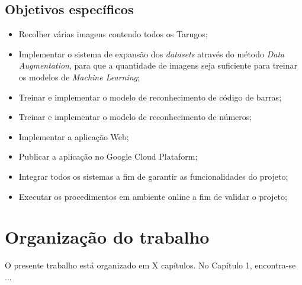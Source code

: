 \subsection{Objetivos específicos}

\begin{itemize}
	\item Recolher várias imagens contendo todos os Tarugos;
	\item Implementar o sistema de expansão dos \textit{datasets} através do método \textit{Data Augmentation}, para que a quantidade de imagens seja suficiente para treinar os modelos de \textit{Machine Learning};
	\item Treinar e implementar o modelo de reconhecimento de código de barras;
	\item Treinar e implementar o modelo de reconhecimento de números;
	\item Implementar a aplicação Web;
	\item Publicar a aplicação no Google Cloud Plataform;
	\item Integrar todos os sistemas a fim de garantir as funcionalidades do projeto;
	\item Executar os procedimentos em ambiente online a fim de validar o projeto;
\end{itemize}


\section{Organização do trabalho}

O presente trabalho está organizado em X capítulos. No Capítulo 1, encontra-se ... 